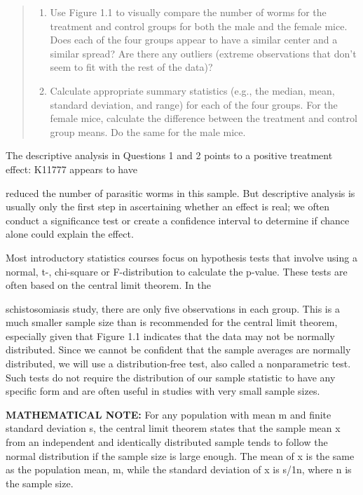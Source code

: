 \documentclass[
]{report}
\providecommand{\tightlist}{%
  \setlength{\itemsep}{0pt}\setlength{\parskip}{0pt}}
\begin{document}
\begin{quote}
\begin{enumerate}
\def\labelenumi{\arabic{enumi}.}
\tightlist
\item
  Use Figure 1.1 to visually compare the number of worms for the treatment and control groups for both
  the male and the female mice. Does each of the four groups appear to have a similar center and a similar
  spread? Are there any outliers (extreme observations that don't seem to fit with the rest of the data)?
\item
  Calculate appropriate summary statistics (e.g., the median, mean, standard deviation, and range) for
  each of the four groups. For the female mice, calculate the difference between the treatment and control
  group means. Do the same for the male mice.
\end{enumerate}
\end{quote}

The descriptive analysis in Questions 1 and 2 points to a positive treatment effect: K11777 appears to have

reduced the number of parasitic worms in this sample. But descriptive analysis is usually only the first step
in ascertaining whether an effect is real; we often conduct a significance test or create a confidence interval
to determine if chance alone could explain the effect.

Most introductory statistics courses focus on hypothesis tests that involve using a normal, t-, chi-square or F-distribution to calculate the p-value. These tests are often based on the central limit theorem. In the

schistosomiasis study, there are only five observations in each group. This is a much smaller sample size
than is recommended for the central limit theorem, especially given that Figure 1.1 indicates that the data
may not be normally distributed. Since we cannot be confident that the sample averages are normally distributed,
we will use a distribution-free test, also called a nonparametric test. Such tests do not require
the distribution of our sample statistic to have any specific form and are often useful in studies with very
small sample sizes.

\large

\textbf{MATHEMATICAL NOTE:}
For any population with mean m and finite standard deviation s, the central limit theorem states that
the sample mean x from an independent and identically distributed sample tends to follow the normal
distribution if the sample size is large enough. The mean of x is the same as the population mean, m, while
the standard deviation of x is s/1n, where n is the sample size.
\end{document}
